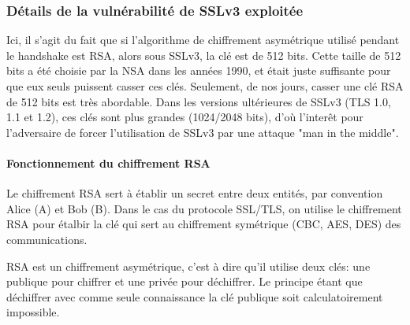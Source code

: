 \subsubsection{Détails de la vulnérabilité de SSLv3 exploitée}

Ici, il s'agit du fait que si l'algorithme de chiffrement asymétrique utilisé pendant le handshake est RSA, alors sous SSLv3, la clé est de 512 bits. Cette taille de 512 bits a été choisie par la NSA dans les années 1990, et était juste suffisante pour que eux seuls puissent casser ces clés. Seulement, de nos jours, casser une clé RSA de 512 bits est très abordable. Dans les versions ultérieures de SSLv3 (TLS 1.0, 1.1 et 1.2), ces clés sont plus grandes (1024/2048 bits), d'où l'inter\^et pour l'adversaire de forcer l'utilisation de SSLv3 par une attaque "man in the middle".

\paragraph{Fonctionnement du chiffrement RSA}

Le chiffrement RSA sert à établir un secret entre deux entités, par convention Alice (A) et Bob (B). Dans le cas du protocole SSL/TLS, on utilise le chiffrement RSA pour étalbir la clé qui sert au chiffrement symétrique (CBC, AES, DES) des communications. 

RSA est un chiffrement asymétrique, c'est à dire qu'il utilise deux clés: une publique pour chiffrer et une privée pour déchiffrer. Le principe étant que déchiffrer avec comme seule connaissance la clé publique soit calculatoirement impossible. \\

